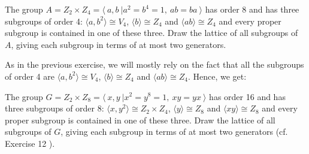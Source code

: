 \begin{exercise}
    The group $A = Z_2 \times Z_4 = \langle \ a,b \ | a^2 = b^4 = 1, \ ab = ba \ \rangle$ has order 8 and has three subgroups of order 4: $\langle a, b^2 \rangle \cong V_4$, $\langle b \rangle \cong Z_4$ and $\langle a b \rangle \cong Z_4$ and every proper subgroup is contained in one of these three. Draw the lattice of all subgroups of $A$, giving each subgroup in terms of at most two generators. \\
\end{exercise}

\begin{solution}
    As in the previous exercise, we will mostly rely on the fact that all the subgroups of order 4 are $\langle a, b^2 \rangle \cong V_4$, $\langle b \rangle \cong Z_4$ and $\langle a b \rangle \cong Z_4$. Hence, we get:
    \begin{center}
    \end{center}
\end{solution}

\begin{exercise}
    The group $G = Z_2 \times Z_8 = \langle \ x,y \ | x^2 = y^8 = 1, \ xy = yx \ \rangle$ has order 16 and has three subgroups of order 8: $\langle x, y^2 \rangle \cong Z_2\times Z_4$, $\langle y \rangle \cong Z_8$ and $\langle xy \rangle \cong Z_8$ and every proper subgroup is contained in one of these three. Draw the lattice of all subgroups of $G$, giving each subgroup in terms of at most two generators (cf. Exercise 12 ). \\
\end{exercise}

